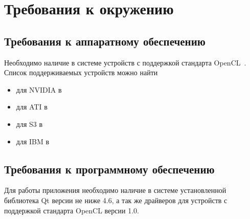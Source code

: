 \section{Требования к окружению}

\subsection{Требования к аппаратному обеспечению}
Необходимо наличие в системе устройств с поддержкой стандарта OpenCL~\cite{opencl_standart}. Список поддерживаемых устройств можно найти 
\begin{itemize}
\item для NVIDIA в \cite{opencl_nvidia_support}
\item для ATI в \cite{opencl_ati_support}
\item для S3 в \cite{opencl_s3_support}
\item для IBM в \cite{opencl_ibm_support}
\end{itemize}

\subsection{Требования к программному обеспечению}
Для работы приложения необходимо наличие в системе установленной библиотека Qt версии не ниже 4.6, а так же драйверов для устройств с поддержкой стандарта OpenCL версии 1.0.
